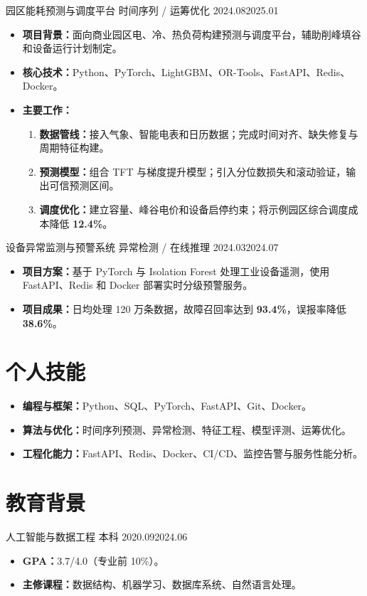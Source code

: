 \documentclass{claritycv}
\begin{document}
\resumeentry
  {园区能耗预测与调度平台}
  {时间序列 / 运筹优化}
  {2024.08}{2025.01}
\begin{itemize}
  \item \textbf{项目背景：}面向商业园区电、冷、热负荷构建预测与调度平台，辅助削峰填谷和设备运行计划制定。
  \item \textbf{核心技术：}Python、PyTorch、LightGBM、OR-Tools、FastAPI、Redis、Docker。
  \item \textbf{主要工作：}
    \begin{enumerate}
      \item \textbf{数据管线：}接入气象、智能电表和日历数据；完成时间对齐、缺失修复与周期特征构建。
      \item \textbf{预测模型：}组合 TFT 与梯度提升模型；引入分位数损失和滚动验证，输出可信预测区间。
      \item \textbf{调度优化：}建立容量、峰谷电价和设备启停约束；将示例园区综合调度成本降低 \textcolor{ResumeAccent}{\textbf{12.4\%}}。
    \end{enumerate}
\end{itemize}


\resumeentry
  {设备异常监测与预警系统}
  {异常检测 / 在线推理}
  {2024.03}{2024.07}
\begin{itemize}
  \item \textbf{项目方案：}基于 PyTorch 与 Isolation Forest 处理工业设备遥测，使用 FastAPI、Redis 和 Docker 部署实时分级预警服务。
  \item \textbf{项目成果：}日均处理 120 万条数据，故障召回率达到 \textcolor{ResumeAccent}{\textbf{93.4\%}}，误报率降低 \textcolor{ResumeAccent}{\textbf{38.6\%}}。
\end{itemize}


\section{个人技能}
\begin{itemize}
  \item \textbf{编程与框架：}Python、SQL、PyTorch、FastAPI、Git、Docker。
  \item \textbf{算法与优化：}时间序列预测、异常检测、特征工程、模型评测、运筹优化。
  \item \textbf{工程化能力：}FastAPI、Redis、Docker、CI/CD、监控告警与服务性能分析。
\end{itemize}

\section{教育背景}
  {人工智能与数据工程 \quad 本科}
  {2020.09}{2024.06}
\begin{itemize}
  \item \textbf{GPA：}3.7/4.0（专业前 10\%）。
  \item \textbf{主修课程：}数据结构、机器学习、数据库系统、自然语言处理。
\end{itemize}
\end{document}
